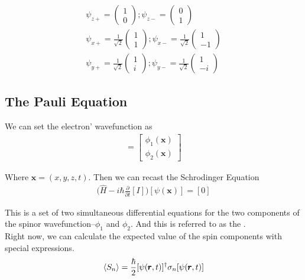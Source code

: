 \begin{gather*}
	\psi_{z+}=\begin{pmatrix}
		1\\0
	\end{pmatrix}; \psi_{z-}=\begin{pmatrix}
		0\\1
	\end{pmatrix}\\
	\psi_{x+}=\frac{1}{\sqrt{2}}\begin{pmatrix}
		1\\1
	\end{pmatrix}; \psi_{x-}=\frac{1}{\sqrt{2}}\begin{pmatrix}
		1\\-1
	\end{pmatrix}\\
	\psi_{y+}=\frac{1}{\sqrt{2}}\begin{pmatrix}
		1\\i
	\end{pmatrix};\psi_{y-}=\frac{1}{\sqrt{2}}\begin{pmatrix}
		1\\-i
	\end{pmatrix}
\end{gather*}


\subsection{The Pauli Equation }
\label{sec: pauli equation}

We can set the electron' wavefunction as 
\begin{align}
	[\psi(\pmb{x})]=\begin{bmatrix}
		\phi_1(\pmb{x})\\ \phi_2(\pmb{x})
	\end{bmatrix}	
\end{align}

Where $\pmb{x}=(x,y,z,t)$. Then we can recast the Schrodinger Equation 
\begin{align}
	\Big (\hat{H}-i\hbar \frac{\partial}{\partial t} [I]\Big)[\psi(\pmb{x})]=[0]
	\label{equ: pauli equation}
\end{align}

This is a set of two simultaneous differential equations for the two components of the spinor wavefunction--$\phi_1$ and $\phi_2$. And this is referred to as the .\\ 

Right now, we can calculate the expected value of the spin components with special expressions. 
\begin{gather}
	\braket{S_n}=\frac{\hbar}{2}[\psi(\pmb{r},t)]^\dagger \sigma_n [\psi(\pmb{r},t)]
\end{gather}


